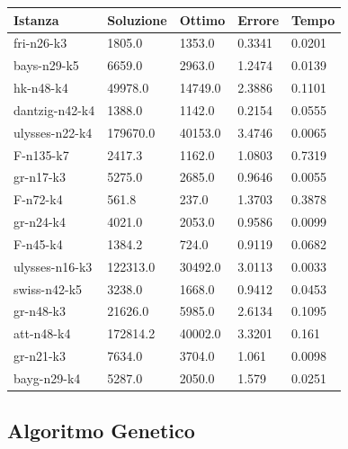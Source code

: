 \documentclass[]{article}
\begin{document}
\begin{table}[h!]
	\begin{center}	
		\begin{tabular}{||l | l l l l||} 
			\hline
			Istanza & Soluzione & Ottimo & Errore & Tempo \\ [0.5ex] 
			\hline\hline
			fri-n26-k3 & 1805.0 & 1353.0 & 0.3341 & 0.0201  \\
			bays-n29-k5 & 6659.0 & 2963.0 & 1.2474 & 0.0139  \\
			hk-n48-k4 & 49978.0 & 14749.0 & 2.3886 & 0.1101  \\
			dantzig-n42-k4 & 1388.0 & 1142.0 & 0.2154 & 0.0555  \\
			ulysses-n22-k4 & 179670.0 & 40153.0 & 3.4746 & 0.0065  \\
			F-n135-k7 & 2417.3 & 1162.0 & 1.0803 & 0.7319  \\
			gr-n17-k3 & 5275.0 & 2685.0 & 0.9646 & 0.0055  \\
			F-n72-k4 & 561.8 & 237.0 & 1.3703 & 0.3878  \\
			gr-n24-k4 & 4021.0 & 2053.0 & 0.9586 & 0.0099  \\
			F-n45-k4 & 1384.2 & 724.0 & 0.9119 & 0.0682  \\
			ulysses-n16-k3 & 122313.0 & 30492.0 & 3.0113 & 0.0033  \\
			swiss-n42-k5 & 3238.0 & 1668.0 & 0.9412 & 0.0453  \\
			gr-n48-k3 & 21626.0 & 5985.0 & 2.6134 & 0.1095  \\
			att-n48-k4 & 172814.2 & 40002.0 & 3.3201 & 0.161  \\
			gr-n21-k3 & 7634.0 & 3704.0 & 1.061 & 0.0098  \\
			bayg-n29-k4 & 5287.0 & 2050.0 & 1.579 & 0.0251  \\		
			[1ex] 
			\hline
		\end{tabular}
	\end{center}
\end{table}

\subsection{Algoritmo Genetico}
\end{document}
